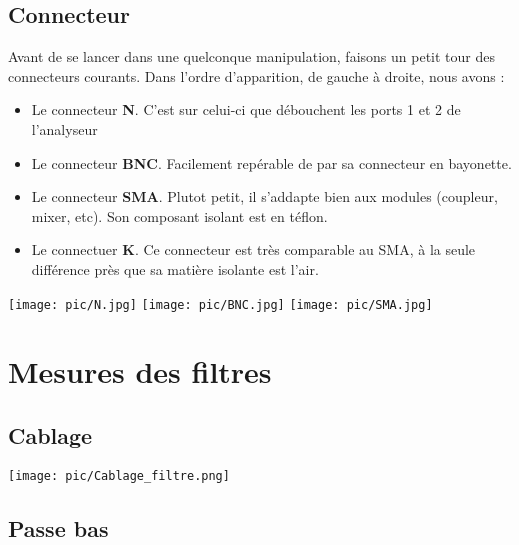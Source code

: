 \documentclass[a4paper,12pt]{report}            %
\begin{document}
\section{Connecteur}

Avant de se lancer dans une quelconque manipulation, faisons un petit tour des connecteurs
courants. Dans l'ordre d'apparition, de gauche à droite, nous avons :
\begin{itemize}
	\item Le connecteur \textbf{N}. C'est sur celui-ci que débouchent les ports 1 et 2 de l'analyseur
	\item Le connecteur \textbf{BNC}. Facilement repérable de par sa connecteur en bayonette.
	\item Le connecteur \textbf{SMA}. Plutot petit, il s'addapte bien aux modules (coupleur, mixer, etc). Son
	      composant isolant est en téflon.
	\item Le connectuer \textbf{K}. Ce connecteur est très comparable au SMA, à la seule différence près
	      que sa matière isolante est l'air.
\end{itemize}

\begin{center}
	\texttt{[image: pic/N.jpg]}
	\texttt{[image: pic/BNC.jpg]}
	\texttt{[image: pic/SMA.jpg]}
\end{center}

\chapter{Mesures des filtres}

\section{Cablage}

\begin{center}\texttt{[image: pic/Cablage\_filtre.png]}\\ \end{center}

\section{Passe bas}
\end{document}
